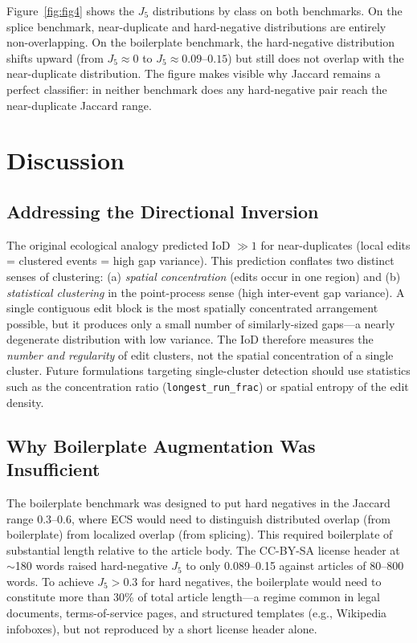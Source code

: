 \documentclass[11pt,letterpaper]{article}
\begin{document}
Figure~\ref{fig:fig4} shows the $J_5$ distributions by class on both benchmarks. On the splice benchmark, near-duplicate and hard-negative distributions are entirely non-overlapping. On the boilerplate benchmark, the hard-negative distribution shifts upward (from $J_5 \approx 0$ to $J_5 \approx 0.09$--$0.15$) but still does not overlap with the near-duplicate distribution. The figure makes visible why Jaccard remains a perfect classifier: in neither benchmark does any hard-negative pair reach the near-duplicate Jaccard range.

\section{Discussion}
\label{sec:discussion}

\subsection{Addressing the Directional Inversion}

The original ecological analogy predicted IoD $\gg 1$ for near-duplicates (local edits = clustered events = high gap variance). This prediction conflates two distinct senses of clustering: (a) \emph{spatial concentration} (edits occur in one region) and (b) \emph{statistical clustering} in the point-process sense (high inter-event gap variance). A single contiguous edit block is the most spatially concentrated arrangement possible, but it produces only a small number of similarly-sized gaps---a nearly degenerate distribution with low variance. The IoD therefore measures the \emph{number and regularity} of edit clusters, not the spatial concentration of a single cluster. Future formulations targeting single-cluster detection should use statistics such as the concentration ratio (\texttt{longest\_run\_frac}) or spatial entropy of the edit density.

\subsection{Why Boilerplate Augmentation Was Insufficient}

The boilerplate benchmark was designed to put hard negatives in the Jaccard range 0.3--0.6, where ECS would need to distinguish distributed overlap (from boilerplate) from localized overlap (from splicing). This required boilerplate of substantial length relative to the article body. The CC-BY-SA license header at $\sim$180 words raised hard-negative $J_5$ to only 0.089--0.15 against articles of 80--800 words. To achieve $J_5 > 0.3$ for hard negatives, the boilerplate would need to constitute more than 30\% of total article length---a regime common in legal documents, terms-of-service pages, and structured templates (e.g., Wikipedia infoboxes), but not reproduced by a short license header alone.
\end{document}
